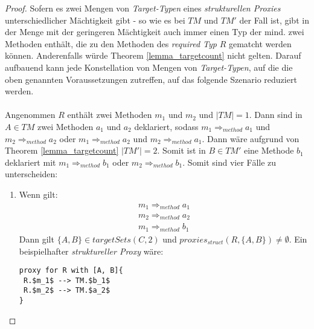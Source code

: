 \begin{proof}
Sofern es zwei Mengen von \emph{Target-Typen} eines \emph{strukturellen Proxies} unterschiedlicher Mächtigkeit gibt - so wie es bei $\mathit{TM}$ und $\mathit{TM'}$ der Fall ist, gibt in der Menge mit der geringeren Mächtigkeit auch immer einen Typ der mind. zwei Methoden enthält, die zu den Methoden des \emph{required Typ} $R$ gematcht werden können. Anderenfalls würde Theorem \ref{lemma_targetcount} nicht gelten.
Darauf aufbauend kann jede Konstellation von Mengen von \emph{Target-Typen}, auf die die oben genannten Voraussetzungen zutreffen, auf das folgende Szenario reduziert werden.
\\\\
Angenommen $R$ enthält zwei Methoden $m_1$ und $m_2$ und $|\mathit{TM}| = 1$.
Dann sind in $A \in \mathit{TM}$ zwei Methoden $a_1$ und $a_2$ deklariert, sodass $m_1 \Rightarrow_{method} a_1$ und $m_2 \Rightarrow_{method} a_2$ oder $m_1 \Rightarrow_{method} a_2$ und $m_2 \Rightarrow_{method} a_1$. Dann wäre aufgrund von Theorem \ref{lemma_targetcount} $|\mathit{TM'}| = 2$. Somit ist in $B \in \mathit{TM'}$ eine Methode $b_1$ deklariert mit $m_1 \Rightarrow_{method} b_1$ oder $m_2 \Rightarrow_{method} b_1$.
Somit sind vier Fälle zu unterscheiden:
\begin{enumerate}
\item 
Wenn gilt: 
\begin{gather*}
m_1 \Rightarrow_{method} a_1 \\
m_2 \Rightarrow_{method} a_2 \\
m_1 \Rightarrow_{method} b_1
\end{gather*}
Dann gilt $\{A, B\} \in \mathit{targetSets(C,2)}$ und $\mathit{proxies_{struct}(R,\{A, B\})} \neq \emptyset$.
Ein beispielhafter \emph{struktureller Proxy} wäre:
\begin{lstlisting}[mathescape, style=dsl]
proxy for R with [A, B]{
 R.$m_1$ --> TM.$b_1$
 R.$m_2$ --> TM.$a_2$
}
\end{lstlisting}


\end{enumerate}
\end{proof}

